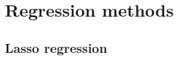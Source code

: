 \documentclass[../main.tex]{subfiles}
\begin{document}
\section{Regression methods}

\subsection{Lasso regression}
\end{document}

